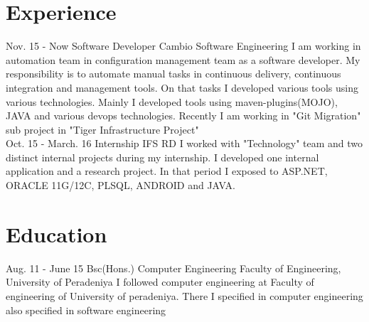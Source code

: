 \documentclass[]{cv-class}
\begin{document}
\section{Experience}
\begin{entrylist}
  \entry
    {Nov. 15 - Now}
    {Software Developer}
    {Cambio Software Engineering}
    {I am working in automation team in configuration management team as a software developer. My responsibility 
    is to automate manual tasks in continuous delivery, continuous integration and management tools. On that tasks
    I developed various tools using various technologies. Mainly I developed tools using maven-plugins(MOJO), JAVA 
    and various devops technologies. Recently I am working in "Git Migration" sub project in "Tiger Infrastructure Project"\\}
  \entry
    {Oct. 15 - March. 16}
    {Internship}
    {IFS RD}
    {I worked with "Technology" team and two distinct internal projects during my internship. I developed one internal
	application and a research project. In that period I exposed to ASP.NET, ORACLE 11G/12C, PLSQL, ANDROID and JAVA.}
\end{entrylist}

\section{Education}
\begin{entrylist}
  \entry
    {Aug. 11 - June 15}
    {Bsc(Hons.) Computer Engineering}
    {Faculty of Engineering, University of Peradeniya}
    {I followed computer engineering at Faculty of engineering of University of peradeniya. There I specified in computer 		   	engineering also specified in software engineering}
\end{entrylist}

\newpage
\end{document}
